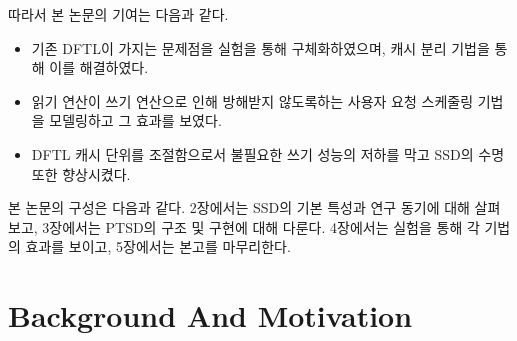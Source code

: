 \documentclass[conference]{IEEEtran}
\begin{document}
따라서 본 논문의 기여는 다음과 같다.
\begin{itemize}
	\item{기존 DFTL이 가지는 문제점을 실험을 통해 구체화하였으며, 캐시 분리 기법을 통해 이를 해결하였다.}
	\item{읽기 연산이 쓰기 연산으로 인해 방해받지 않도록하는 사용자 요청 스케줄링 기법을 모델링하고 그 효과를 보였다.}
	\item{DFTL 캐시 단위를 조절함으로서 불필요한 쓰기 성능의 저하를 막고 SSD의 수명 또한 향상시켰다.}
\end{itemize}
\par

본 논문의 구성은 다음과 같다. 2장에서는 SSD의 기본 특성과 연구 동기에 대해 살펴보고, 3장에서는 PTSD의 구조 및
구현에 대해 다룬다. 4장에서는 실험을 통해 각 기법의 효과를 보이고, 5장에서는 본고를 마무리한다.


\section{Background And Motivation}
\end{document}
